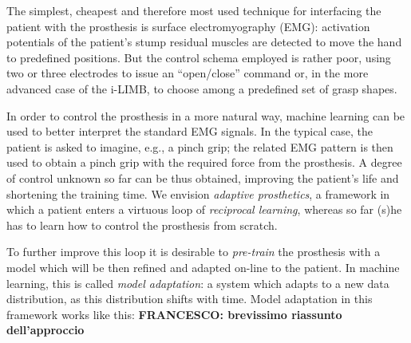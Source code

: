The simplest, cheapest and therefore most used technique for
interfacing the patient with the prosthesis is surface
electromyography (EMG): activation potentials of the patient's stump
residual muscles are detected to move the hand to predefined
positions. But the control schema employed is rather poor, using two
or three electrodes to issue an ``open/close'' command or, in the more
advanced case of the i-LIMB, to choose among a predefined set of grasp
shapes.


In order to control the prosthesis in a more natural way, machine
learning can be used to better interpret the standard EMG signals. In
the typical case, the patient is asked to imagine, e.g., a pinch grip;
the related EMG pattern is then used to obtain a pinch grip with the
required force from the prosthesis. A degree of control unknown so far
can be thus obtained, improving the patient's life and shortening the
training time. We envision \emph{adaptive prosthetics}, a framework in
which a patient enters a virtuous loop of \emph{reciprocal learning},
whereas so far (s)he has to learn how to control the prosthesis from
scratch.


To further improve this loop it is desirable to \emph{pre-train} the
prosthesis with a model which will be then refined and adapted on-line
to the patient. In machine learning, this is called \emph{model
adaptation}: a system which adapts to a new data distribution, as this
distribution shifts with time. Model adaptation in this framework
works like this: \textbf{FRANCESCO: brevissimo riassunto dell'approccio}


